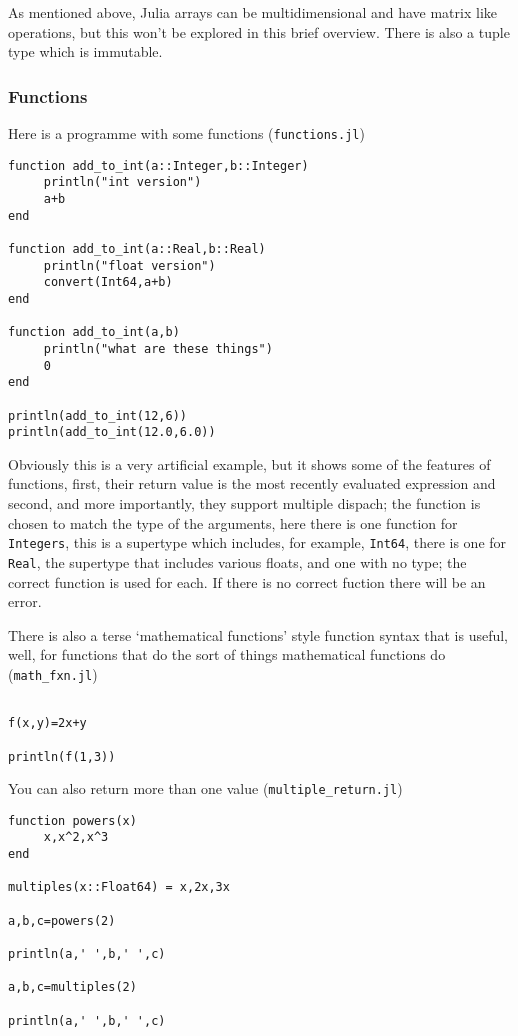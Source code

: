 \documentclass[11pt,a4paper]{scrartcl}
\begin{document}
As mentioned above, Julia arrays can be multidimensional and have
matrix like operations, but this won't be explored in this brief
overview. There is also a tuple type which is immutable.

\subsubsection*{Functions}
Here is a programme with some functions (\texttt{functions.jl})
\begin{lstlisting}[numbers=right]
function add_to_int(a::Integer,b::Integer)
	 println("int version")
	 a+b
end

function add_to_int(a::Real,b::Real)
	 println("float version")
	 convert(Int64,a+b)
end

function add_to_int(a,b)
	 println("what are these things")
	 0
end

println(add_to_int(12,6))
println(add_to_int(12.0,6.0))
\end{lstlisting}
Obviously this is a very artificial example, but it shows some of the
features of functions, first, their return value is the most recently
evaluated expression and second, and more importantly, they support
multiple dispach; the function is chosen to match the type of the
arguments, here there is one function for \texttt{Integers}, this is a
supertype which includes, for example, \texttt{Int64}, there is one
for \texttt{Real}, the supertype that includes various floats, and one
with no type; the correct function is used for each. If there is no
correct fuction there will be an error.

There is also a terse \lq{}mathematical functions\rq{} style function
syntax that is useful, well, for functions that do the sort of things
mathematical functions do (\texttt{math\_fxn.jl})
\begin{lstlisting}[numbers=right]

f(x,y)=2x+y

println(f(1,3))

\end{lstlisting}
You can also return more than one value (\texttt{multiple\_return.jl})
\begin{lstlisting}[numbers=right]
function powers(x)
	 x,x^2,x^3
end

multiples(x::Float64) = x,2x,3x

a,b,c=powers(2)

println(a,' ',b,' ',c)

a,b,c=multiples(2)

println(a,' ',b,' ',c)

\end{lstlisting}
\end{document}
